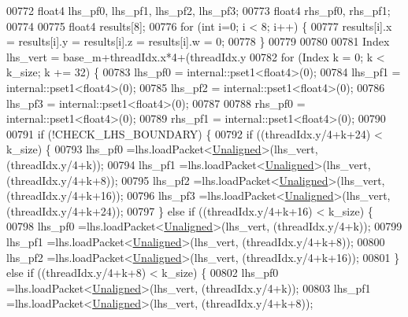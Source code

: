 \begin{DoxyCode}
00772   float4 lhs\_pf0, lhs\_pf1, lhs\_pf2, lhs\_pf3;
00773   float4 rhs\_pf0, rhs\_pf1;
00774 
00775   float4 results[8];
00776   \textcolor{keywordflow}{for} (\textcolor{keywordtype}{int} i=0; i < 8; i++) \{
00777     results[i].x = results[i].y = results[i].z = results[i].w = 0;
00778   \}
00779 
00780 
00781   Index lhs\_vert = base\_m+threadIdx.x*4+(threadIdx.y%
00782   \textcolor{keywordflow}{for} (Index k = 0; k < k\_size; k += 32) \{
00783     lhs\_pf0 = internal::pset1<float4>(0);
00784     lhs\_pf1 = internal::pset1<float4>(0);
00785     lhs\_pf2 = internal::pset1<float4>(0);
00786     lhs\_pf3 = internal::pset1<float4>(0);
00787 
00788     rhs\_pf0 = internal::pset1<float4>(0);
00789     rhs\_pf1 = internal::pset1<float4>(0);
00790 
00791      \textcolor{keywordflow}{if} (!CHECK\_LHS\_BOUNDARY) \{
00792       \textcolor{keywordflow}{if} ((threadIdx.y/4+k+24) < k\_size) \{
00793         lhs\_pf0 =lhs.loadPacket<\hyperlink{group__enums_gga45fe06e29902b7a2773de05ba27b47a1ac935220b4c844108e183ebe30a4d5204}{Unaligned}>(lhs\_vert, (threadIdx.y/4+k));
00794         lhs\_pf1 =lhs.loadPacket<\hyperlink{group__enums_gga45fe06e29902b7a2773de05ba27b47a1ac935220b4c844108e183ebe30a4d5204}{Unaligned}>(lhs\_vert, (threadIdx.y/4+k+8));
00795         lhs\_pf2 =lhs.loadPacket<\hyperlink{group__enums_gga45fe06e29902b7a2773de05ba27b47a1ac935220b4c844108e183ebe30a4d5204}{Unaligned}>(lhs\_vert, (threadIdx.y/4+k+16));
00796         lhs\_pf3 =lhs.loadPacket<\hyperlink{group__enums_gga45fe06e29902b7a2773de05ba27b47a1ac935220b4c844108e183ebe30a4d5204}{Unaligned}>(lhs\_vert, (threadIdx.y/4+k+24));
00797       \} \textcolor{keywordflow}{else} \textcolor{keywordflow}{if} ((threadIdx.y/4+k+16) < k\_size) \{
00798         lhs\_pf0 =lhs.loadPacket<\hyperlink{group__enums_gga45fe06e29902b7a2773de05ba27b47a1ac935220b4c844108e183ebe30a4d5204}{Unaligned}>(lhs\_vert, (threadIdx.y/4+k));
00799         lhs\_pf1 =lhs.loadPacket<\hyperlink{group__enums_gga45fe06e29902b7a2773de05ba27b47a1ac935220b4c844108e183ebe30a4d5204}{Unaligned}>(lhs\_vert, (threadIdx.y/4+k+8));
00800         lhs\_pf2 =lhs.loadPacket<\hyperlink{group__enums_gga45fe06e29902b7a2773de05ba27b47a1ac935220b4c844108e183ebe30a4d5204}{Unaligned}>(lhs\_vert, (threadIdx.y/4+k+16));
00801       \} \textcolor{keywordflow}{else} \textcolor{keywordflow}{if} ((threadIdx.y/4+k+8) < k\_size) \{
00802         lhs\_pf0 =lhs.loadPacket<\hyperlink{group__enums_gga45fe06e29902b7a2773de05ba27b47a1ac935220b4c844108e183ebe30a4d5204}{Unaligned}>(lhs\_vert, (threadIdx.y/4+k));
00803         lhs\_pf1 =lhs.loadPacket<\hyperlink{group__enums_gga45fe06e29902b7a2773de05ba27b47a1ac935220b4c844108e183ebe30a4d5204}{Unaligned}>(lhs\_vert, (threadIdx.y/4+k+8));

\end{DoxyCode}
